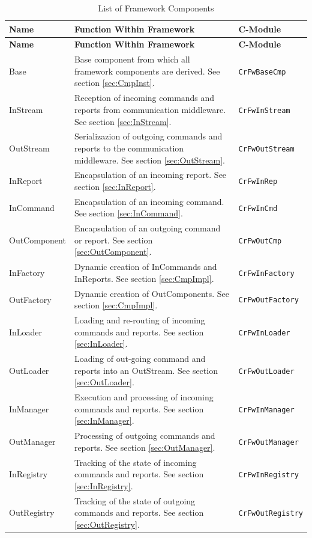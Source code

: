 \documentclass[a4paper,10pt]{article}
\begin{document}
\begin{longtable}{|p{2.4cm}|p{5.5cm}|p{2.7cm}|}
\caption{List of Framework Components} \label{tab:CmpList}\\
\hline
\rowcolor{light-gray}
\textbf{Name} & \textbf{Function Within Framework} & \textbf{C-Module} \\
\hline\hline
\endfirsthead
\rowcolor{light-gray}
\textbf{Name} & \textbf{Function Within Framework} & \textbf{C-Module} \\
\hline\hline
\endhead
Base & Base component from which all framework components are derived. See section \ref{sec:CmpInst}. & \texttt{CrFwBaseCmp} \\
\hline
InStream & Reception of incoming commands and reports from communication middleware. See section \ref{sec:InStream}. & \texttt{CrFwInStream} \\
\hline
OutStream & Serializazion of outgoing commands and reports to the communication middleware. See section \ref{sec:OutStream}. & \texttt{CrFwOutStream} \\
\hline
InReport & Encapsulation of an incoming report. See section \ref{sec:InReport}. & \texttt{CrFwInRep} \\
\hline
InCommand & Encapsulation of an incoming command. See section \ref{sec:InCommand}. & \texttt{CrFwInCmd} \\
\hline
OutComponent & Encapsulation of an outgoing command or report. See section \ref{sec:OutComponent}. & \texttt{CrFwOutCmp} \\
\hline
InFactory & Dynamic creation of InCommands and InReports. See section \ref{sec:CmpImpl}. & \texttt{CrFwInFactory} \\
\hline
OutFactory & Dynamic creation of OutComponents. See section \ref{sec:CmpImpl}. & \texttt{CrFwOutFactory} \\
\hline
InLoader & Loading and re-routing of incoming commands and reports. See section \ref{sec:InLoader}. & \texttt{CrFwInLoader} \\
\hline
OutLoader & Loading of out-going command and reports into an OutStream. See section \ref{sec:OutLoader}. & \texttt{CrFwOutLoader} \\
\hline
InManager & Execution and processing of incoming commands and reports. See section \ref{sec:InManager}. & \texttt{CrFwInManager} \\
\hline
OutManager & Processing of outgoing commands and reports. See section \ref{sec:OutManager}. & \texttt{CrFwOutManager} \\
\hline
InRegistry & Tracking of the state of incoming commands and reports. See section \ref{sec:InRegistry}. & \texttt{CrFwInRegistry} \\
\hline
OutRegistry & Tracking of the state of outgoing commands and reports. See section \ref{sec:OutRegistry}. & \texttt{CrFwOutRegistry} \\
\hline
\end{longtable}
\end{document}
